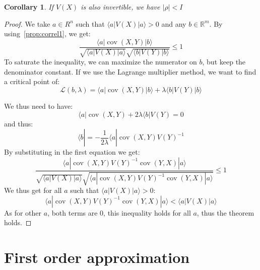 \documentclass[10pt]{report}
\theoremstyle{plain}
\newtheorem{cor}{Corollary}[thm]
\theoremstyle{definition}
\theoremstyle{remark}
\newcommand{\R}{\ensuremath{\mathbb{R}}}
\newcommand{\ket}[1]{|#1\rangle}
\newcommand{\bra}[1]{\langle#1|}
\renewcommand{\leq}{\leqslant}
\DeclareMathOperator{\cov}{cov}
\begin{document}
\begin{cor}
  If $V(X)$ is also invertible, we have $|\rho| < I$
\end{cor}

\begin{proof}
  We take $a \in R^n$ such that $\bra a V(X) \ket a > 0$ and any $b \in \R^m$.
  By using~\cref{prop:correl1}, we get:
  \[ \frac{ \bra a \cov(X,Y) \ket b}{\sqrt{\bra a V(X) \ket a}\sqrt{\bra b V(Y)
        \ket b}} \leq 1\]
  To saturate the inequality, we can maximize the numerator on $b$, but keep the
  denominator constant. If we use the Lagrange multiplier method, we want to
  find a critical point of:
  \[\mathcal{L}(b,\lambda) = \bra a \cov(X,Y) \ket b + \lambda \bra b V(Y) \ket
    b\]

  We thus need to have:
  \[ \bra a \cov(X,Y) + 2\lambda\bra b V(Y) = 0\]
  and thus:
  \[ \bra b = - \frac 1 {2\lambda} \bra a \cov(X,Y) {V(Y)}^{-1}\]
  By substituting in the first equation we get:
  \[ \frac{ \bra a \cov(X,Y) {V(Y)}^{-1} \cov(Y,X) \ket a}
    {\sqrt{\bra a V(X) \ket a}
      \sqrt{\bra a \cov(X,Y) {V(Y)}^{-1} \cov(Y,X) \ket a}} \leq 1\]
  We thus get for all $a$ such that $\bra a V(X) \ket a > 0$:
  \[ \bra a \cov(X,Y) {V(Y)}^{-1} \cov(Y,X) \ket a < \bra a V(X) \ket a\]
  As for other $a$, both terms are 0, this inequality holds for all $a$, thus
  the theorem holds.
\end{proof}



\section{First order approximation}



\end{document}
